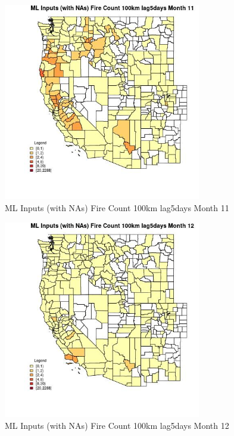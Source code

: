 \begin{figure} 
\centering  
\includegraphics[width=0.77\textwidth]{Code_Outputs/Report_ML_input_PM25_Step4_part_e_de_duplicated_aves_compiled_2019-05-20wNAs_CountyFire_Count_100km_lag5daysmedianMonth11.jpg} 
\caption{\label{fig:Report_ML_input_PM25_Step4_part_e_de_duplicated_aves_compiled_2019-05-20wNAsCountyFire_Count_100km_lag5daysmedianMonth11}ML Inputs (with NAs) Fire Count 100km lag5days Month 11} 
\end{figure} 
 

\begin{figure} 
\centering  
\includegraphics[width=0.77\textwidth]{Code_Outputs/Report_ML_input_PM25_Step4_part_e_de_duplicated_aves_compiled_2019-05-20wNAs_CountyFire_Count_100km_lag5daysmedianMonth12.jpg} 
\caption{\label{fig:Report_ML_input_PM25_Step4_part_e_de_duplicated_aves_compiled_2019-05-20wNAsCountyFire_Count_100km_lag5daysmedianMonth12}ML Inputs (with NAs) Fire Count 100km lag5days Month 12} 
\end{figure} 
 

